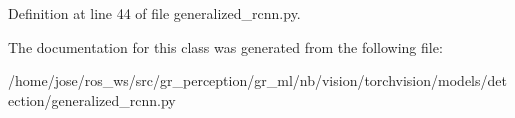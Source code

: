 Definition at line 44 of file generalized\+\_\+rcnn.\+py.



The documentation for this class was generated from the following file\+:\begin{DoxyCompactItemize}
\item 
/home/jose/ros\+\_\+ws/src/gr\+\_\+perception/gr\+\_\+ml/nb/vision/torchvision/models/detection/generalized\+\_\+rcnn.\+py\end{DoxyCompactItemize}
